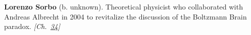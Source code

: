 \textbf{Lorenzo Sorbo} (b. unknown). Theoretical physicist who collaborated with Andreas Albrecht in 2004 to revitalize the discussion of the Boltzmann Brain paradox. \emph{[Ch.~\hyperref[ch:boltzmannbrain]{34}]}

